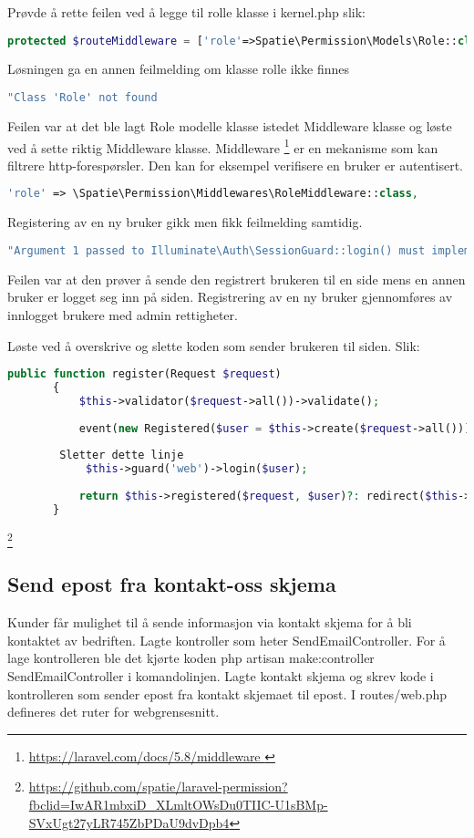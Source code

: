 Prøvde å rette feilen ved å legge til rolle klasse i kernel.php slik:
\begin{lstlisting}[language=PHP]
   protected $routeMiddleware = ['role'=>Spatie\Permission\Models\Role::class]; 
\end{lstlisting}  
Løsningen ga en annen feilmelding om klasse rolle ikke finnes
 \begin{lstlisting}[language=PHP]
      "Class 'Role' not found
 \end{lstlisting}

Feilen var at det ble lagt Role modelle klasse istedet Middleware klasse og løste ved å sette riktig Middleware klasse. Middleware \footnote{\url{https://laravel.com/docs/5.8/middleware }} er en mekanisme som kan  filtrere http-forespørsler. Den kan for eksempel verifisere en bruker er autentisert. 
\begin{lstlisting}[language=PHP]
   'role' => \Spatie\Permission\Middlewares\RoleMiddleware::class,
\end{lstlisting}

Registering av en ny bruker gikk men fikk feilmelding samtidig.
\begin{lstlisting}[language=PHP]
   "Argument 1 passed to Illuminate\Auth\SessionGuard::login() must implement interface Illuminate\Contracts\Auth\Authenticatable, null given,
\end{lstlisting}

Feilen var at den prøver å sende den registrert brukeren til en side mens en annen  bruker er logget seg inn på siden. Registrering av en ny bruker gjennomføres av innlogget brukere med admin rettigheter.

Løste ved å overskrive og slette koden som sender brukeren til siden. Slik:
\begin{lstlisting}[language=PHP]
   public function register(Request $request)
       {
           $this->validator($request->all())->validate();
    
           event(new Registered($user = $this->create($request->all())));
    
        Sletter dette linje
            $this->guard('web')->login($user);
    
           return $this->registered($request, $user)?: redirect($this->redirectPath());
       }
\end{lstlisting}
  
\footnote{\url{https://github.com/spatie/laravel-permission?fbclid=IwAR1mbxiD_XLmltOWsDu0TIIC-U1sBMp-SVxUgt27yLR745ZbPDaU9dvDpb4}}  

\subsection{Send epost fra kontakt-oss skjema}

Kunder får mulighet til å sende informasjon via kontakt skjema for å bli kontaktet av bedriften.
Lagte kontroller som heter SendEmailController.
For å lage kontrolleren ble det kjørte koden 
php artisan make:controller SendEmailController i komandolinjen.
Lagte kontakt skjema og skrev kode i kontrolleren som sender epost fra kontakt skjemaet til epost. I routes/web.php defineres det ruter for webgrensesnitt.

\clearpage